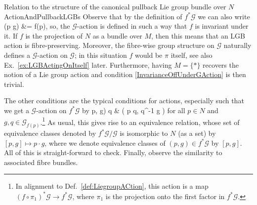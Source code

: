 \documentclass[a4paper,oneside,11pt,bibliography=totoc]{scrartcl}
\def\ba#1\ea{\begin{align}#1\end{align}}
\def\bas#1\eas{\begin{align*}#1\end{align*}}
\theoremstyle{plain}
\theoremstyle{remark}
\theoremstyle{definition}
\begin{document}
\begin{remarks}{Relation to the structure of the canonical pullback Lie group bundle over $N$}{ActionAndPullbackLGBs}
Observe that by the definition of $f^*\mathcal{G}$ we can also write
\bas
f(p \cdot g) &= f(p),
\eas
so, the $\mathcal{G}$-action is defined in such a way that $f$ is invariant under it. If $f$ is the projection of $N$ as a bundle over $M$, then this means that an LGB action is fibre-preserving. Moreover, the fibre-wise group structure on $\mathcal{G}$ naturally defines a $\mathcal{G}$-action on $\mathcal{G}$; in this situation $f$ would be $\pi$ itself, see also Ex.\ \ref{ex:LGBActingOnItself} later. Furthermore, having $M = \{*\}$ recovers the notion of a Lie group action and condition \eqref{InvarianceOffUnderGAction} is then trivial.
\newline

The other conditions are the typical conditions for actions, especially such that we get a $\mathcal{G}$-action on $f^*\mathcal{G}$ by
\ba
(p, g) \cdot q
&\coloneqq
\mleft( p \cdot q, q^{-1} g \mright)
\ea
for all $p \in N$ and $g, q \in \mathcal{G}_{f(p)}$.\footnote{In alignment to Def.\ \ref{def:LiegroupACtion}, this action is a map $(f \circ \pi_1)^*\mathcal{G} \to f^*\mathcal{G}$, where $\pi_1$ is the projection onto the first factor in $f^*\mathcal{G}$.}
As usual, this gives rise to an equivalence relation, whose set of equivalence classes denoted by $f^*\mathcal{G} \Big/ \mathcal{G}$ is isomorphic to $N$ (as a set) by $[p, g] \mapsto p \cdot g$, where we denote equivalence classes of $(p, g) \in f^*\mathcal{G}$ by $[p, g]$. All of this is straight-forward to check. Finally, observe the similarity to associated fibre bundles.
\end{remarks}
\end{document}
